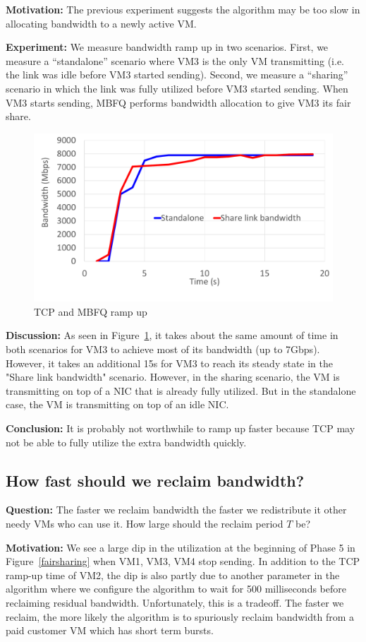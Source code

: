 {\bf Motivation:} The previous experiment suggests the algorithm may be too slow
in allocating bandwidth to a newly active VM.  

{\bf Experiment:} We measure bandwidth ramp up in two scenarios.  First, we
measure a  ``standalone'' scenario where VM3 is the only VM transmitting (i.e. the link
was idle before VM3 started sending).  Second, we measure a  ``sharing'' scenario
in which the link was fully utilized before VM3 started sending. When VM3 starts
sending, MBFQ performs bandwidth allocation to give VM3 its fair share.

\begin{figure}[h]
\centering
\includegraphics[width=0.6\columnwidth,trim=60pt 40mm 0pt 8mm]{figures/rampupcomparison}
\caption{TCP and MBFQ ramp up}
\label{rampupcomparison}
\vspace{-3mm}
\end{figure}

{\bf Discussion:} As seen in Figure~\ref{rampupcomparison}, it takes about the
same amount of time in both scenarios for VM3 to achieve most of its bandwidth
(up to 7Gbps). However, it takes an additional 15s for VM3 to reach its steady
state  in the "Share link bandwidth" scenario. However, in the sharing scenario,
the VM is transmitting on top of a NIC that is already fully utilized.
But in the standalone case, the VM is transmitting on top of an idle NIC. 

{\bf Conclusion:} It is probably not worthwhile 
to ramp up faster because TCP may not be able to fully utilize the extra
bandwidth quickly.

\subsection{How fast should we reclaim bandwidth?}
\label{reclaimbw}
{\bf Question:}  The faster we reclaim bandwidth the
faster we redistribute it other needy VMs who can use it. How large should the
reclaim period $T$ be?

{\bf Motivation:} 
We see a large dip in the utilization at the beginning of Phase 5 in
Figure~\ref{fairsharing} when VM1, VM3, VM4 stop sending.  In addition to the
TCP ramp-up time of VM2, the dip is also partly due to another parameter in the
algorithm where we configure the algorithm to wait for 500 milliseconds before
reclaiming residual bandwidth.  Unfortunately, this is a tradeoff.  The faster we
reclaim, the more likely the algorithm is to spuriously reclaim bandwidth from a
paid customer VM which has short term bursts.

